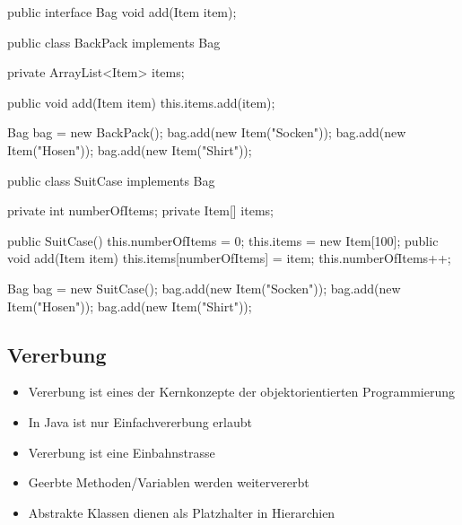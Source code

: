 \documentclass[a4paper,10pt, dvipsnames]{report}
\begin{document}
\begin{minipage}{0.48\linewidth}
\begin{javacodebox}
public interface Bag {
    void add(Item item);
}
\end{javacodebox}

\begin{javacodebox}
public class BackPack implements Bag {
    private ArrayList<Item> items;

    public void add(Item item) {
        this.items.add(item);
    }
}
\end{javacodebox}

\begin{javacodebox}
Bag bag = new BackPack();
bag.add(new Item("Socken"));
bag.add(new Item("Hosen"));
bag.add(new Item("Shirt"));
\end{javacodebox}
\end{minipage}
\hfill %
\begin{minipage}{0.48\linewidth}
\begin{javacodebox}
public class SuitCase implements Bag {
    private int numberOfItems;
    private Item[] items;

    public SuitCase() {
        this.numberOfItems = 0;
        this.items = new Item[100];
    }
    public void add(Item item) {
        this.items[numberOfItems] = item;
        this.numberOfItems++;
    }
}
\end{javacodebox}

\begin{javacodebox}
Bag bag = new SuitCase();
bag.add(new Item("Socken"));
bag.add(new Item("Hosen"));
bag.add(new Item("Shirt"));
\end{javacodebox}
\end{minipage}



\subsection{Vererbung}

\begin{itemize}
	\item Vererbung ist eines der Kernkonzepte der objektorientierten Programmierung
	\item In Java ist nur Einfachvererbung erlaubt
	\item Vererbung ist eine Einbahnstrasse
	\item Geerbte Methoden/Variablen werden weitervererbt
	\item Abstrakte Klassen dienen als Platzhalter in Hierarchien
\end{itemize}
\end{document}

